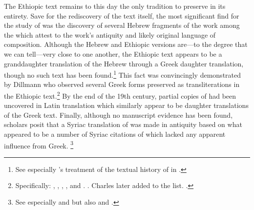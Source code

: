 The Ethiopic text remains to this day the only tradition to preserve \jub in its entirety. Save for the rediscovery of the text itself, the most significant find for the study of \jub was the discovery of several Hebrew fragments of the work among the \dss which attest to the work's antiquity and likely original language of composition. Although the Hebrew and Ethiopic versions are---to the degree that we can tell---very close to one another, the Ethiopic text appears to be a granddaughter translation of the Hebrew through a Greek daughter translation, though no such text has been found.\footnote{See especially \vanderkam's treatment of the textual history of \jub in \cite*[1--18]{vanderkam1977}.} This fact was convincingly demonstrated by Dillmann who observed several Greek forms preserved as transliterations in the Ethiopic text.\footnote{Specifically: , , , , and . \cite[88]{dillamnn_jbw1850}. Charles later added  to the list. \cite[xxx]{charles1902}.} By the end of the 19th century, partial copies of \jub had been uncovered in Latin translation which similarly appear to be daughter translations of the Greek text. Finally, although no manuscript evidence has been found, \jub scholars posit that a Syriac translation of \jub was made in antiquity based on what appeared to be a number of Syriac citations of \jub which lacked any apparent influence from Greek.%
%
\footnote{%
See especially \cite[231--232]{tisserant_rb1921} and \cite[xxix]{charles1902} but also \cite[2:ix--x]{ceriani1861} and \cite[x]{charles1895}.}


\nocite{dillamnn_jbw_kleine}